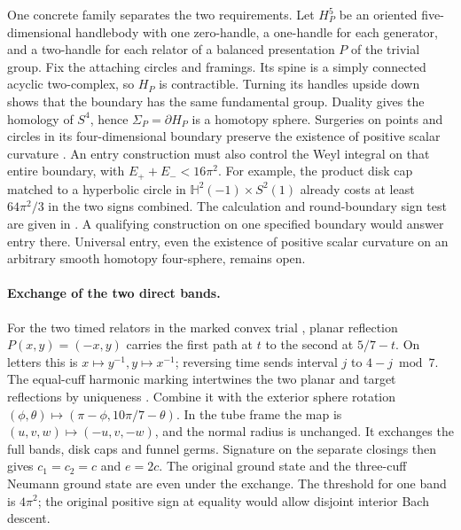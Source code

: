 \documentclass[11pt,letterpaper]{article}
\numberwithin{equation}{section}
\begin{document}
One concrete family separates the two requirements. Let \(H_P^5\) be an
oriented five-dimensional handlebody with one zero-handle, a one-handle for each generator, and a two-handle for
each relator of a balanced presentation \(P\) of the trivial group.
Fix the attaching circles and framings. Its spine is
a simply connected acyclic two-complex, so \(H_P\) is contractible.
Turning its handles upside down shows that the boundary has the same
fundamental group. Duality gives the homology of \(S^4\), hence
\(\Sigma_P=\partial H_P\) is a homotopy sphere. Surgeries on points and
circles in its four-dimensional boundary preserve the existence of positive
scalar curvature \cite[Theorem A]{GromovLawson1980Surgery}. An entry
construction must also control the Weyl integral on that entire boundary, with \(E_++E_-<16\pi^2\). For example, the product disk cap matched to a
hyperbolic circle in \(\mathbb H^2(-1)\times S^2(1)\) already costs at
least \(64\pi^2/3\) in the two signs combined. The calculation and
round-boundary sign test are given in \cite[Positivity of a prescribed
exterior]{Baker2026FixedDescent}. A qualifying construction on one
specified boundary would answer entry there. Universal entry, even the
existence of positive scalar curvature on an arbitrary smooth homotopy
four-sphere, remains open.



\paragraph{Exchange of the two direct bands.}
For the two timed relators in the marked convex trial
\cite{Baker2026ThreeFunnelComparison}, planar reflection
\(P(x,y)=(-x,y)\) carries the first path at \(t\) to the second at
\(5/7-t\). On letters this is \(x\mapsto y^{-1}, y\mapsto x^{-1}\);
reversing time sends interval \(j\) to \(4-j\bmod 7\).
The equal-cuff harmonic marking intertwines the two planar and target
reflections by uniqueness \cite[\S2]{Wolf1989Harmonic}.
Combine it with the exterior sphere rotation
\((\phi,\theta)\mapsto(\pi-\phi,10\pi/7-\theta)\). In the tube frame
the map is \((u,v,w)\mapsto(-u,v,-w)\), and the normal radius is
unchanged. It exchanges the full bands, disk caps and funnel germs.
Signature on the separate closings then gives
\(c_1=c_2=c\) and \(e=2c\). The original ground state and the
three-cuff Neumann ground state are even under the exchange.
The threshold for one band is \(4\pi^2\); the original positive
sign at equality would allow disjoint interior Bach descent.
\end{document}
